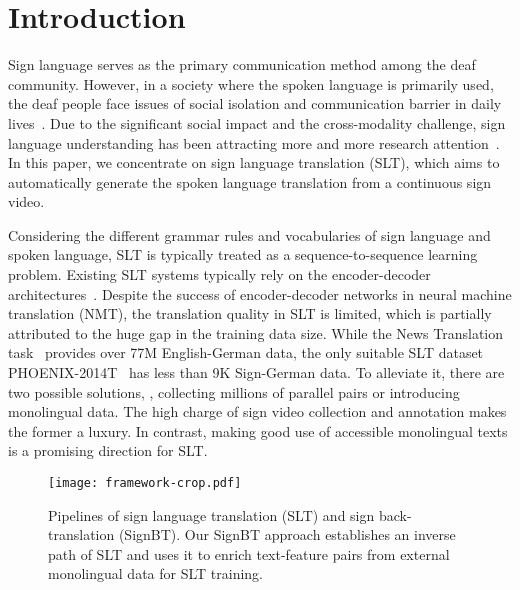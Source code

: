 \documentclass[final]{cvpr}
\begin{document}
\section{Introduction}


Sign language serves as the primary communication method among the deaf community. 
However, in a society where the spoken language is primarily used, the deaf people face issues of social isolation and communication barrier in daily lives~\cite{bragg2019slp}. 
Due to the significant social impact and the cross-modality challenge, sign language understanding has been attracting more and more research attention~\cite{bsl1k-20,bragg2019slp,slt-nslt-cihan18,huang18han,hmm-koller-tpami19,islr-transfer-cvpr2020,fingerspelling19iccv,wang16isolated}. 
In this paper, we concentrate on sign language translation (SLT), 
which aims to automatically generate the spoken language translation from a continuous sign video. 

Considering the different grammar rules and vocabularies of sign language and spoken language, SLT is typically treated as a sequence-to-sequence learning problem. 
Existing SLT systems typically rely on the encoder-decoder architectures~\cite{slt-nslt-cihan18,slt-trans-cihan20,tspnet-nips20}. 
Despite the success of encoder-decoder networks in neural machine translation (NMT), the translation quality in SLT is limited, which is partially attributed to the huge gap in the training data size. 
While the News Translation task~\cite{WMT19findings} provides over 77M English-German data, 
the only suitable SLT dataset PHOENIX-2014T~\cite{slt-nslt-cihan18} has less than 9K Sign-German data. 
To alleviate it, there are two possible solutions, \ie, collecting millions of parallel pairs or introducing monolingual data. 
The high charge of sign video collection and annotation makes the former a luxury. 
In contrast, making good use of accessible monolingual texts is a promising direction for SLT. 


\begin{figure}[tp]
   \centering
   \texttt{[image: framework-crop.pdf]}
   \caption{Pipelines of sign language translation (SLT) and sign back-translation (SignBT). 
   Our SignBT approach establishes an inverse path of SLT and uses it to enrich text-feature pairs from external monolingual data for SLT training.}\label{fig:pipeline}
   \vspace{-4pt}
\end{figure}
\end{document}
